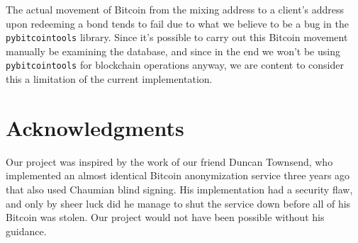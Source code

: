 \documentclass[12pt]{article}
\begin{document}
The actual movement of Bitcoin from the mixing address to a client's address upon redeeming a bond tends to fail due to what we believe to be a bug in the \texttt{pybitcointools} library. Since it's possible to carry out this Bitcoin movement manually be examining the database, and since in the end we won't be using \texttt{pybitcointools} for blockchain operations anyway, we are content to consider this a limitation of the current implementation.

\section{Acknowledgments}
Our project was inspired by the work of our friend Duncan Townsend, who implemented an almost identical Bitcoin anonymization service three years ago that also used Chaumian blind signing.
His implementation had a security flaw, and only by sheer luck did he manage to shut the service down before all of his Bitcoin was stolen.
Our project would not have been possible without his guidance.
\end{document}
